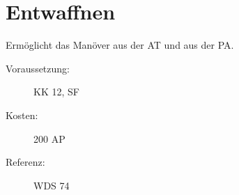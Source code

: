 \section{Entwaffnen}
\label{sf.entwaffnen}
Ermöglicht das Manöver  aus der AT und  aus der PA.
\begin{description}
    \item[Voraussetzung:]
        KK 12, SF 
    \item [Kosten:]
        200 AP
    \item [Referenz:]
        WDS 74
\end{description}
